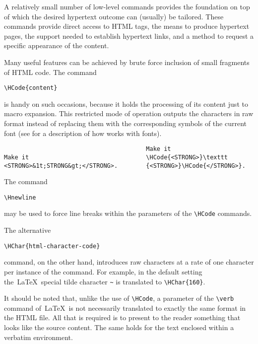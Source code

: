 

A relatively small number of low-level commands provides the foundation
on top of which the desired hypertext outcome can (usually) be tailored.
These commands provide direct access to HTML tags, the means to produce
hypertext pages, the support needed to establish hypertext links, and a
method to request a specific appearance of the content. 


Many useful features can be achieved by brute force inclusion of small fragments of 
HTML code. The command 

\begin{verbatim}
\HCode{content} 
\end{verbatim}

is handy on such occasions, because it holds the processing of its
content just to macro expansion. This restricted mode of operation
outputs the characters in raw format instead of replacing them with the
corresponding symbols of the current font (see  for a
description of how \texht works with fonts). 

\begin{verbatim}
                                        Make it 
Make it                                 \HCode{<STRONG>}\texttt 
<STRONG>&1t;STRONG&gt;</STRONG>.        {<STRONG>}\HCode{</STRONG>}. 
\end{verbatim}

The command 

\begin{verbatim}
\Hnewline 
\end{verbatim}

may be used to force line breaks within the parameters of the \verb|\HCode| commands. 

The alternative 

\begin{verbatim}
\HChar{html-character-code} 
\end{verbatim}

command, on the other hand, introduces raw characters at a rate of one
character per instance of the command. For example, in the default
setting the\ \LaTeX\ special tilde character \verb|~| is translated to
\verb|\HChar{160}|. 

It should be noted that, unlike the use of \verb|\HCode|, a parameter of the \verb|\verb| 
command of\ \LaTeX\ is not necessarily translated to exactly the same format in the 
HTML file. All that is required is to present to the reader something that looks 
like the source content. The same holds for the text enclosed within a verbatim 
environment. 

